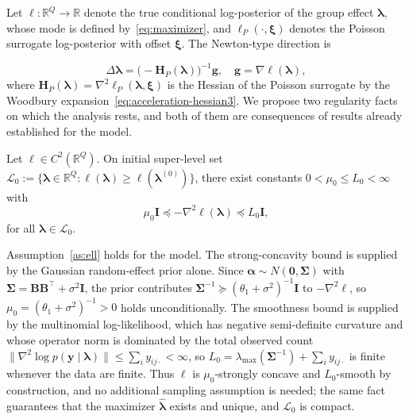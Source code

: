 Let $\ell: \mathbb{R}^{Q}\to \mathbb{R}$ denote the true conditional log-posterior of the group effect $\bm{\lambda}$, whose mode is defined by~\eqref{eq:maximizer}, and $\ell_{P}(\cdot,\bm{\xi})$ denotes the Poisson surrogate log-posterior with offset $\bm{\xi}$. The Newton-type direction is 

\begin{equation}
    \Delta \bm{\lambda}=\bigl(-\mathbf{H}_{P}(\bm{\lambda})\bigr)^{-1}\mathbf{g}, \quad \mathbf{g}=\nabla\ell(\bm{\lambda}),
    \label{eq:newton-type-direction}
\end{equation}
where $\mathbf{H}_{P}(\bm{\lambda})=\nabla^{2}\ell_{P}(\bm{\lambda},\bm{\xi})$ is the Hessian of the Poisson surrogate by the Woodbury expansion~\eqref{eq:acceleration-hessian3}. We propose two regularity facts on which the analysis rests, and both of them are consequences of results already established for the model.

\begin{assumption}
    Let $\ell\in C^{2}(\mathbb{R}^{Q})$. On initial super-level set $\mathcal{L}_{0}:=\{\bm{\lambda}\in\mathbb{R}^{Q}:\ell(\bm{\lambda})\geq \ell(\bm{\lambda}^{(0)})\}$, there exist constants $0<\mu_{0}\leq L_{0}<\infty$ with
    \begin{equation}
        \mu_{0}\mathbf{I}\preceq -\nabla^{2}\ell(\bm{\lambda})\preceq L_{0}\mathbf{I},
    \end{equation}
    for all $\bm{\lambda}\in\mathcal{L}_{0}$.
    \label{as:ell}
\end{assumption}

Assumption~\ref{as:ell} holds for the model. The strong-concavity bound is supplied by
the Gaussian random-effect prior alone. Since $\bm{\alpha}\sim N(\mathbf 0,\bm{\Sigma})$ with
$\bm{\Sigma}=\mathbf{B}\mathbf{B}^{\top}+\sigma^{2}\mathbf{I}$, the prior contributes
$\bm{\Sigma}^{-1}\succeq(\theta_{1}+\sigma^{2})^{-1}\mathbf{I}$ to $-\nabla^{2}\ell$, so
$\mu_{0}=(\theta_{1}+\sigma^{2})^{-1}>0$ holds unconditionally.
The smoothness bound is supplied by the multinomial log-likelihood, which has
negative semi-definite curvature and whose operator norm is dominated by the total observed count
$\bigl\lVert\nabla^{2}\log p(\bm{y}\mid\bm{\lambda})\bigr\rVert\le\sum_{i}y_{ij\cdot}<\infty$, so
$L_{0}=\lambda_{\max}(\bm{\Sigma}^{-1})+\sum_{i}y_{ij\cdot}$ is finite whenever the data are finite.
Thus $\ell$ is $\mu_{0}$-strongly concave and $L_{0}$-smooth by construction, and no additional
sampling assumption is needed; the same fact guarantees that the maximizer $\hat{\bm{\lambda}}$
exists and unique, and $\mathcal{L}_{0}$ is compact.

